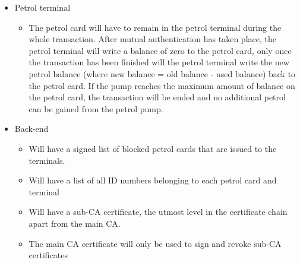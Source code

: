 \begin{itemize}
\item Petrol terminal
\begin{itemize}
\item The petrol card will have to remain in the petrol terminal during the whole transaction. After mutual authentication has taken place, the petrol terminal will write a balance of zero to the petrol card, only once the transaction has been finished will the petrol terminal write the new petrol balance (where new balance = old balance - used balance) back to the petrol card. If the pump reaches the maximum amount of balance on the petrol card, the transaction will be ended and no additional petrol can be gained from the petrol pump. 




\end{itemize}


\item Back-end
\begin{itemize}
	\item Will have a signed list of blocked petrol cards that are issued to the terminals.
	\item Will have a list of all ID numbers belonging to each petrol card and terminal
	\item Will have a sub-CA certificate, the utmost level in the certificate chain apart from the main CA.
	\item The main CA certificate will only be used to sign and revoke sub-CA certificates
\end{itemize}
\end{itemize}
